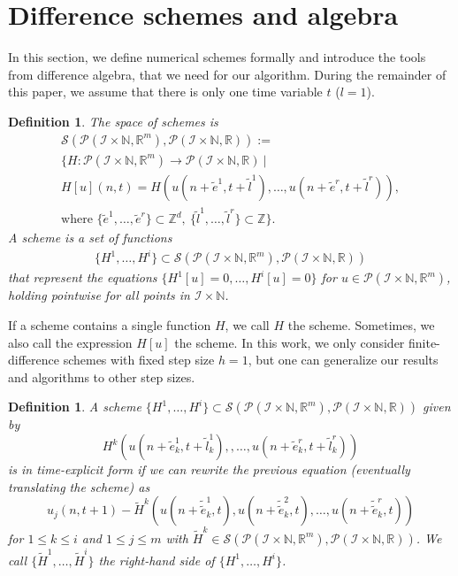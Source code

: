 \documentclass[sigconf,twocolumn]{acmart}
\newcommand{\Rr}{{\mathbb{R}}}
\newcommand{\Nn}{{\mathbb{N}}}
\newcommand{\Zz}{{\mathbb{Z}}}
\newcommand{\1}{{\chi}}
\newcommand{\Ii}{{\mathcal{I}}}
\numberwithin{equation}{section}
\theoremstyle{thmlemcorr}
\numberwithin{theorem}{section}
\theoremstyle{thmlemcorr*}
\theoremstyle{defi}
\newtheorem{definition}[theorem]{Definition}
\theoremstyle{remexample}
\theoremstyle{ass}
\begin{document}
\section{Difference schemes and algebra}
\label{algodetec}
In this section, we define numerical schemes formally and introduce the tools from difference algebra, that we need for our algorithm.
During the remainder of this paper, we assume that there is only one time variable $t$ ($l=1$).
\begin{definition}
	The space of schemes is
	\begin{gather*}
		\mathcal{S}(\mathcal{P}(\Ii\times\Nn,\Rr^m),\mathcal{P}(\Ii\times\Nn,\Rr)):=\\
		\Bigg\{H:\mathcal{P}(\Ii\times\Nn,\Rr^m)\rightarrow\mathcal{P}(\Ii\times\Nn,\Rr)\ \Bigg|\\
			H[u](n,t)=H(u(n+\tilde{e}^1,t+\tilde{l}^1),\ldots,u(n+\tilde{e}^r,t+\tilde{l}^r)),\\
			\text{where }
		\{\tilde{e}^1,\ldots,\tilde{e}^r\}\subset\Zz^d,\ \{\tilde{l}^1,\ldots,\tilde{l}^r\}\subset\Zz
		\Bigg\}.
	\end{gather*}
	A scheme is a set of functions
	\begin{gather*}
		\{H^1,\ldots,H^i\}\subset\mathcal{S}(\mathcal{P}(\Ii\times\Nn,\Rr^m),\mathcal{P}(\Ii\times\Nn,\Rr))
	\end{gather*}
	that represent the equations $\{H^1[u]=0,\ldots,H^i[u]=0\}$ for $u\in\mathcal{P}(\Ii\times\Nn,\Rr^m)$, holding pointwise for all points in $\Ii\times\Nn$.
\end{definition}
If a scheme contains a single function $H$, we call $H$ the scheme. Sometimes, we also call the expression $H[u]$ the scheme.
In this work, we only consider finite-difference schemes with fixed step size $h=1$, but one can generalize our results and algorithms to other step sizes.
\begin{definition}
	A scheme $\{H^1,\ldots,H^i\}\subset\mathcal{S}(\mathcal{P}(\Ii\times\Nn,\Rr^m),\mathcal{P}(\Ii\times\Nn,\Rr))$ given by
	\begin{equation*}
		H^k(u(n+\tilde{e}_k^1,t+\tilde{l}_k^1),,\ldots,u(n+\tilde{e}_k^r,t+\tilde{l}_k^r))
	\end{equation*}
	is in time-explicit form if we can rewrite the previous equation (eventually translating the scheme) as
	\begin{equation*}
		u_j(n,t+1)-\tilde{H}^k(u(n+\tilde{\tilde{e}}_k^1,t),u(n+\tilde{\tilde{e}}_k^2,t),\ldots,u(n+\tilde{\tilde{e}}_k^r,t))
	\end{equation*}
	for $1\leq k\leq i$ and $1\leq j\leq m$
	with $\tilde{H}^k\in\mathcal{S}(\mathcal{P}(\Ii\times\Nn,\Rr^m),\mathcal{P}(\Ii\times\Nn,\Rr))$. We call $\{\tilde{H}^1,\ldots,\tilde{H}^i\}$ the right-hand side of $\{H^1,\ldots,H^i\}$.
\end{definition}
\end{document}
